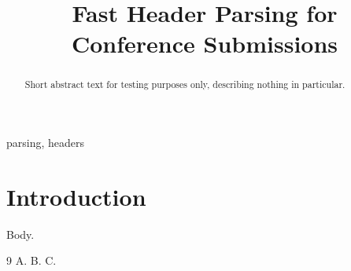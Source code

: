 \documentclass[conference]{IEEEtran}
\begin{document}
\title{Fast Header Parsing for Conference Submissions}
\author{
\and
{}
}
\maketitle
\begin{abstract}
Short abstract text for testing purposes only, describing nothing in particular.
\end{abstract}
\begin{IEEEkeywords}
parsing, headers
\end{IEEEkeywords}
\section{Introduction}
Body.
\begin{thebibliography}{9}
 A.
 B.
 C.
\end{thebibliography}
\end{document}

